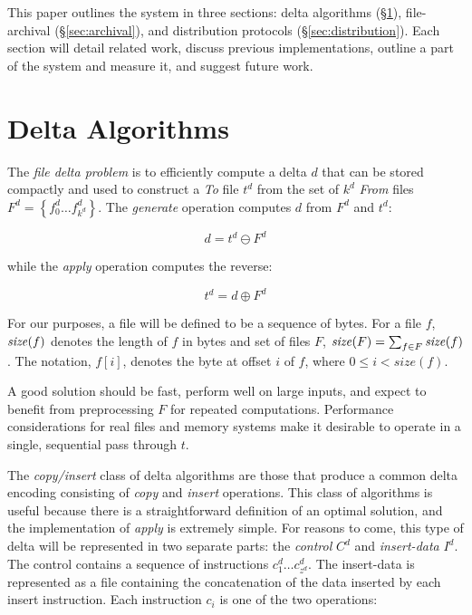 \documentclass{llncs}
\begin{document}
This paper outlines the \xd {} system in three sections: delta
algorithms (\S\ref{sec:delta}), file-archival (\S\ref{sec:archival}),
and distribution protocols (\S\ref{sec:distribution}).  Each section
will detail related work, discuss previous implementations, outline a
part of the system and measure it, and suggest future work.

\section{Delta Algorithms}\label{sec:delta}

The \emph{file delta problem} is to efficiently compute a delta $d$
that can be stored compactly and used to construct a \emph{To} file
$t^d$ from the set of $k^d$ \emph{From} files $F^d = \left\{ f^d_0
\ldots f^d_{k^d} \right\}$.  The \emph{generate} operation computes
$d$ from $F^d$ and $t^d$:

\begin{equation}
d = t^d \ominus F^d
\end{equation}

\noindent while the \emph{apply} operation computes the reverse:

\begin{equation}
t^d = d \oplus F^d
\end{equation}

For our purposes, a file will be defined to be a sequence of bytes.
For a file $f$, $\textrm{\emph{size}}(f)$ denotes the length of $f$ in bytes and set
of files $F$, $\textrm{\emph{size}}(F) = \sum_{f \in F} \textrm{\emph{size}}(f)$.  The notation,
$f[i]$, denotes the byte at offset $i$ of $f$, where $0 \le i <
size(f)$.

A good solution should be fast, perform well on large inputs, and
expect to benefit from preprocessing $F$ for repeated computations.
Performance considerations for real files and memory systems make it
desirable to operate in a single, sequential pass through $t$.

The \emph{copy/insert} class of delta algorithms are those that
produce a common delta encoding consisting of \emph{copy} and
\emph{insert} operations.  This class of algorithms is useful because
there is a straightforward definition of an optimal solution, and the
implementation of \emph{apply} is extremely simple.  For reasons to
come, this type of delta will be represented in two separate parts:
the \emph{control} $C^d$ and \emph{insert-data} $I^d$.  The control
contains a sequence of instructions $c^d_1 \ldots c^d_{z^d}$.  The
insert-data is represented as a file containing the concatenation of
the data inserted by each insert instruction.  Each instruction $c_i$
is one of the two operations:
\end{document}
